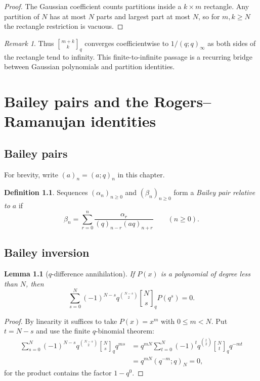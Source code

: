 \documentclass[11pt,oneside,openany]{book}
\newtheorem{lemma}[lemma]{Lemma}
\theoremstyle{definition}
\newtheorem{definition}[definition]{Definition}
\theoremstyle{remark}
\newtheorem{remark}[remark]{Remark}
\newcommand{\qbinom}[2]{\genfrac{[}{]}{0pt}{}{#1}{#2}_{q}}
\begin{document}
\begin{proof}
The Gaussian coefficient counts partitions inside a $k\times m$ rectangle.  Any partition of $N$ has at most $N$ parts and largest part at most $N$, so for $m,k\ge N$ the rectangle restriction is vacuous.
\end{proof}

\begin{remark}
Thus $\qbinom{m+k}{k}$ converges coefficientwise to $1/(q;q)_\infty$ as both sides of the rectangle tend to infinity.  This finite-to-infinite passage is a recurring bridge between Gaussian polynomials and partition identities.
\end{remark}

\chapter{Bailey pairs and the Rogers--Ramanujan identities}\label{chap:bailey}

\section{Bailey pairs}

For brevity, write $(a)_n=(a;q)_n$ in this chapter.

\begin{definition}
Sequences $(\alpha_n)_{n\ge0}$ and $(\beta_n)_{n\ge0}$ form a \emph{Bailey pair relative to $a$} if
\[
 \beta_n=\sum_{r=0}^{n}\frac{\alpha_r}{(q)_{n-r}(aq)_{n+r}}
 \qquad(n\ge0).
\]
\end{definition}

\section{Bailey inversion}

\begin{lemma}[$q$-difference annihilation]\label{lem:qdiff-annihilation}
If $P(x)$ is a polynomial of degree less than $N$, then
\[
 \sum_{s=0}^{N}(-1)^{N-s}q^{\binom{N-s}{2}}
 \qbinom Ns P(q^s)=0.
\]
\end{lemma}

\begin{proof}
By linearity it suffices to take $P(x)=x^m$ with $0\le m<N$.  Put $t=N-s$ and use the finite $q$-binomial theorem:
\begin{align*}
 \sum_{s=0}^{N}(-1)^{N-s}q^{\binom{N-s}{2}}\qbinom Ns q^{ms}
 &=q^{mN}\sum_{t=0}^{N}(-1)^tq^{\binom t2}\qbinom Ntq^{-mt}\\
 &=q^{mN}(q^{-m};q)_N=0,
\end{align*}
for the product contains the factor $1-q^0$.
\end{proof}
\end{document}
